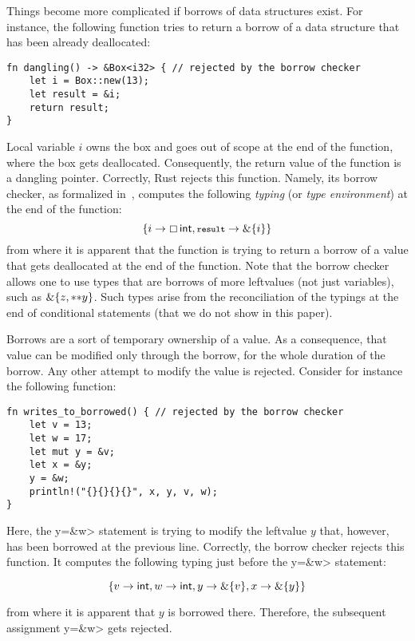 Things become more complicated if borrows of data structures exist.
For instance, the following function tries to return a borrow of
a data structure that has been already deallocated:

\begin{verbatim}
fn dangling() -> &Box<i32> { // rejected by the borrow checker
    let i = Box::new(13);
    let result = &i;
    return result;
}
\end{verbatim}

\noindent
Local variable $i$ owns the box and goes out of scope at the end of the
function, where the box gets deallocated. Consequently, the return value of
the function is a dangling pointer. Correctly, Rust rejects this function.
Namely, its borrow checker, as formalized in~\cite{Pearce21}, computes the
following \emph{typing} (or \emph{type environment}) at the end of the function:
\[
\{i\to\boxtype{\mathsf{int},\<result>\to\borrow\{i\}}\}
\]
from where it is apparent that the function is trying to return a borrow
of a value that gets deallocated at the end of the function. Note that the borrow
checker allows one to
use types that are borrows of more leftvalues (not just variables),
such as $\&\{z,\mathtt{**}y\}$.
Such types arise from the reconciliation of the typings at the end of
conditional statements (that we do not show in this paper).

Borrows are a sort of temporary ownership of a value. As a consequence,
that value can be modified only through the borrow, for the whole
duration of the borrow. Any other attempt to modify the value is rejected.
Consider for instance the following function:

\begin{verbatim}
fn writes_to_borrowed() { // rejected by the borrow checker
    let v = 13;
    let w = 17;
    let mut y = &v;
    let x = &y;
    y = &w;
    println!("{}{}{}{}", x, y, v, w);
}
\end{verbatim}

\noindent
Here, the \<y=\&w> statement is trying to modify the leftvalue $y$
that, however, has been borrowed at the previous line. Correctly, the borrow
checker rejects this function. It computes the following typing
just before the \<y=\&w> statement:

\[
\{v\to\mathsf{int},w\to\mathsf{int},y\to\&\{v\},x\to\&\{y\}\}
\]

\noindent
from where it is apparent that $y$ is borrowed there. Therefore,
the subsequent assignment \<y=\&w> gets rejected.

